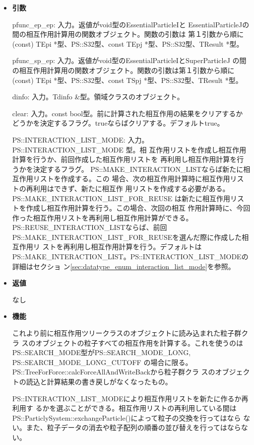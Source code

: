 \begin{itemize}

\item {\bf 引数}

pfunc\_ep\_ep: 入力。返値がvoid型のEssentialParticleIと
EssentialParticleJの間の相互作用計算用の関数オブジェクト。関数の引数は
第１引数から順に(const) TEpi *型、PS::S32型、const
TEpj *型、PS::S32型、TResult *型。

pfunc\_sp\_ep: 入力。返値がvoid型のEssentialParticleIとSuperParticleJ
の間の相互作用計算用の関数オブジェクト。関数の引数は第１引数から順に
(const) TEpi *型、PS::S32型、const TSpj *型、PS::S32型、TResult *型。

dinfo: 入力。Tdinfo \&型。領域クラスのオブジェクト。

clear: 入力。const bool型。前に計算された相互作用の結果をクリアするか
どうかを決定するフラグ。trueならばクリアする。デフォルトtrue。

PS::INTERACTION\_LIST\_MODE: 入力。PS::INTERACTION\_LIST\_MODE 型。相
互作用リストを作成し相互作用計算を行うか、前回作成した相互作用リストを
再利用し相互作用計算を行うかを決定するフラグ。
PS::MAKE\_INTERACTION\_LISTならば新たに相互作用リストを作成する。この
場合、次の相互作用計算時に相互作用リストの再利用はできず、新たに相互作
用リストを作成する必要がある。PS::MAKE\_INTERACTION\_LIST\_FOR\_REUSE
は新たに相互作用リストを作成し相互作用計算を行う。この場合、次回の相互
作用計算時に、今回作った相互作用リストを再利用し相互作用計算ができる。
PS::REUSE\_INTERACTION\_LISTならば、前回
PS::MAKE\_INTERACTION\_LIST\_FOR\_REUSEを選んだ際に作成した相互作用リ
ストを再利用し相互作用計算を行う。デフォルトは
PS::MAKE\_INTERACTION\_LIST。PS::INTERACTION\_LIST\_MODEの詳細はセクショ
ン\ref{sec:datatype_enum_interaction_list_mode}を参照。

\item {\bf 返値}

なし

\item {\bf 機能}

これより前に相互作用ツリークラスのオブジェクトに読み込まれた粒子群クラ
スのオブジェクトの粒子すべての相互作用を計算する。これを使うのは
PS::SEARCH\_MODE型がPS::SEARCH\_MODE\_LONG, PS::SEARCH\_MODE\_LONG\_CUTOFF
の場合に限る。PS::TreeForForce::calcForceAllAndWriteBackから粒子群クラ
スのオブジェクトの読込と計算結果の書き戻しがなくなったもの。

PS::INTERACTION\_LIST\_MODEにより相互作用リストを新たに作るか再利用す
るかを選ぶことができる。相互作用リストの再利用している間は
PS::ParticlySystem::exchangeParticle()によって粒子の交換を行ってはなら
ない。また、粒子データの消去や粒子配列の順番の並び替えを行ってはならな
い。

\end{itemize}

